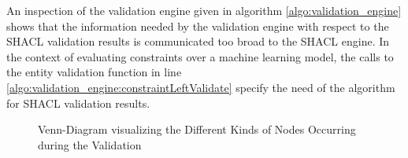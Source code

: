 An inspection of the validation engine given in algorithm \ref{algo:validation_engine} shows that the information needed by the validation engine with respect to the SHACL validation results is communicated too broad to the SHACL engine. In the context of evaluating constraints over a machine learning model, the calls to the entity validation function in line \ref{algo:validation_engine:constraintLeftValidate} specify the need of the algorithm for SHACL validation results.

\begin{figure}
    \centering
        \caption{Venn-Diagram visualizing the Different Kinds of Nodes Occurring during the Validation}   \label{fig:venn_diagram_showing_instances_to_reduce_during_shacl_validation}
\end{figure}



